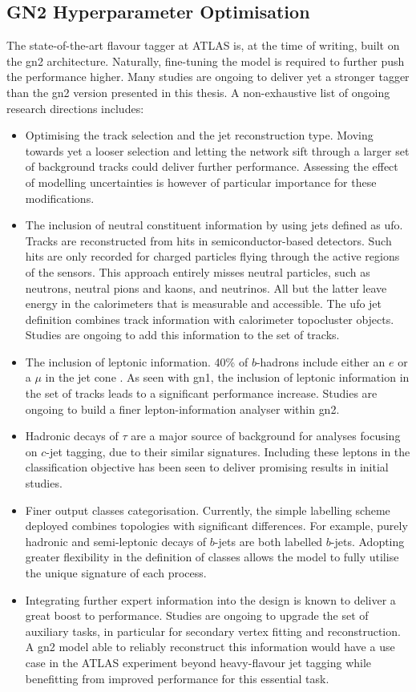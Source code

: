 \subsection{GN2 Hyperparameter Optimisation}\label{chap-GN2Opt}
The state-of-the-art flavour tagger at ATLAS is, at the time of writing, built on the \gls{gn2} architecture. Naturally, fine-tuning the model is required to further push the performance higher. Many studies are ongoing to deliver yet a stronger tagger than the \gls{gn2} version presented in this thesis. A non-exhaustive list of ongoing research directions includes: 
\begin{itemize}
  \item Optimising the track selection and the jet reconstruction type. Moving towards yet a looser selection and letting the network sift through a larger set of background tracks could deliver further performance. Assessing the effect of modelling uncertainties is however of particular importance for these modifications.
  \item The inclusion of neutral constituent information by using jets defined as \gls{ufo}. Tracks are reconstructed from hits in semiconductor-based detectors. Such hits are only recorded for charged particles flying through the active regions of the sensors. This approach entirely misses neutral particles, such as neutrons, neutral pions and kaons, and neutrinos. All but the latter leave energy in the calorimeters that is measurable and accessible. The \gls{ufo} jet definition combines track information with calorimeter topocluster objects. Studies are ongoing to add this information to the set of tracks. 
  \item The inclusion of leptonic information. 40\% of $b$-hadrons include either an $e$ or a $\mu$ in the jet cone \cite{Tanabashi:2018oca}. As seen with \gls{gn1}, the inclusion of leptonic information in the set of tracks leads to a significant performance increase. Studies are ongoing to build a finer lepton-information analyser within \gls{gn2}.
  \item Hadronic decays of $\tau$ are a major source of background for analyses focusing on $c$-jet tagging, due to their similar signatures. Including these leptons in the classification objective has been seen to deliver promising results in initial studies. 
  \item Finer output classes categorisation. Currently, the simple labelling scheme deployed combines topologies with significant differences. For example, purely hadronic and semi-leptonic decays of $b$-jets are both labelled $b$-jets. Adopting greater flexibility in the definition of classes allows the model to fully utilise the unique signature of each process. 
  \item Integrating further expert information into the design is known to deliver a great boost to performance. Studies are ongoing to upgrade the set of auxiliary tasks, in particular for secondary vertex fitting and reconstruction. A \gls{gn2} model able to reliably reconstruct this information would have a use case in the ATLAS experiment beyond heavy-flavour jet tagging while benefitting from improved performance for this essential task.  
\end{itemize}

